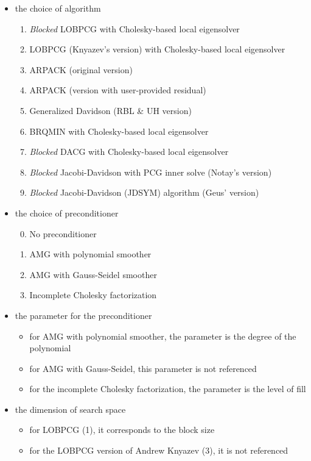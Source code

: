 \documentclass[11pt]{article}
\begin{document}
\begin{itemize}
\item the choice of algorithm
	\begin{enumerate}
	\item {\it Blocked} LOBPCG with Cholesky-based local eigensolver
	\setcounter{enumi}{2}
	\item LOBPCG (Knyazev's version) with Cholesky-based local eigensolver
	\setcounter{enumi}{4}
	\item ARPACK (original version)
	\item ARPACK (version with user-provided residual)
	\item Generalized Davidson (RBL \& UH version)
	\setcounter{enumi}{8}
	\item BRQMIN with Cholesky-based local eigensolver
         \setcounter{enumi}{10}
         \item {\it Blocked} DACG with Cholesky-based local eigensolver
         \setcounter{enumi}{12}
	\item {\it Blocked} Jacobi-Davidson with PCG inner solve (Notay's version)
	\setcounter{enumi}{14}
	\item {\it Blocked}  Jacobi-Davidson (JDSYM) algorithm (Geus' version)
	\end{enumerate}
\item the choice of preconditioner
	\begin{enumerate}	\setcounter{enumi}{-1}
	\item No preconditioner	\item AMG with polynomial smoother
	\item AMG with Gauss-Seidel smoother
	\item Incomplete Cholesky factorization	\end{enumerate}
\item the parameter for the preconditioner
	\begin{itemize}
	\item for AMG with polynomial smoother, the parameter is the degree of the polynomial
	\item for AMG with Gauss-Seidel, this parameter is not referenced
	\item for the incomplete Cholesky factorization, the parameter is the level of fill	\end{itemize}
\item the dimension of search space
	\begin{itemize}
	\item for LOBPCG (1), it corresponds to the block size
	\item for the LOBPCG version of Andrew Knyazev (3), it is not referenced

\end{itemize}
\end{itemize}
\end{document}
